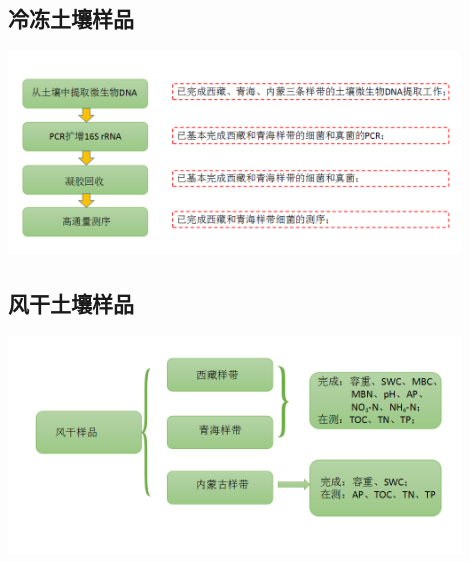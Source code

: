 \subsection{冷冻土壤样品}
\begin{frame}{\insertsection}{\insertsubsection}
	\begin{center}
		\includegraphics[width = 0.9\textwidth]{./pic/3.3.png}
	\end{center}
\end{frame}
\subsection{风干土壤样品}
\begin{frame}{\insertsection}{\insertsubsection}
		\begin{center}
			\includegraphics[width = 0.9\textwidth]{./pic/3.4.png}
		\end{center}
\end{frame}
